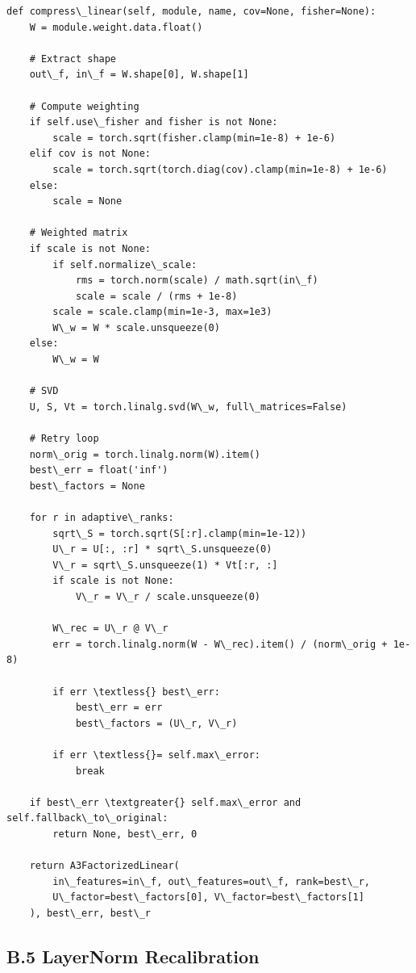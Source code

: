 \begin{lstlisting}
def compress\_linear(self, module, name, cov=None, fisher=None):
    W = module.weight.data.float()
    
    # Extract shape
    out\_f, in\_f = W.shape[0], W.shape[1]
    
    # Compute weighting
    if self.use\_fisher and fisher is not None:
        scale = torch.sqrt(fisher.clamp(min=1e-8) + 1e-6)
    elif cov is not None:
        scale = torch.sqrt(torch.diag(cov).clamp(min=1e-8) + 1e-6)
    else:
        scale = None
    
    # Weighted matrix
    if scale is not None:
        if self.normalize\_scale:
            rms = torch.norm(scale) / math.sqrt(in\_f)
            scale = scale / (rms + 1e-8)
        scale = scale.clamp(min=1e-3, max=1e3)
        W\_w = W * scale.unsqueeze(0)
    else:
        W\_w = W
    
    # SVD
    U, S, Vt = torch.linalg.svd(W\_w, full\_matrices=False)
    
    # Retry loop
    norm\_orig = torch.linalg.norm(W).item()
    best\_err = float('inf')
    best\_factors = None
    
    for r in adaptive\_ranks:
        sqrt\_S = torch.sqrt(S[:r].clamp(min=1e-12))
        U\_r = U[:, :r] * sqrt\_S.unsqueeze(0)
        V\_r = sqrt\_S.unsqueeze(1) * Vt[:r, :]
        if scale is not None:
            V\_r = V\_r / scale.unsqueeze(0)
        
        W\_rec = U\_r @ V\_r
        err = torch.linalg.norm(W - W\_rec).item() / (norm\_orig + 1e-8)
        
        if err \textless{} best\_err:
            best\_err = err
            best\_factors = (U\_r, V\_r)
        
        if err \textless{}= self.max\_error:
            break
    
    if best\_err \textgreater{} self.max\_error and self.fallback\_to\_original:
        return None, best\_err, 0
    
    return A3FactorizedLinear(
        in\_features=in\_f, out\_features=out\_f, rank=best\_r,
        U\_factor=best\_factors[0], V\_factor=best\_factors[1]
    ), best\_err, best\_r
\end{lstlisting}

\subsection{B.5 LayerNorm Recalibration}

